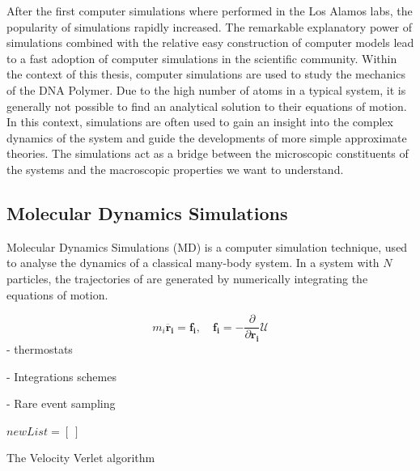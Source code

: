 After the first computer simulations where performed in the Los Alamos labs, the
popularity of simulations rapidly increased. The remarkable explanatory power of
simulations combined with the relative easy construction of computer models lead to a
fast adoption of computer simulations in the scientific community. Within the context of
this thesis, computer simulations are used to study the mechanics of
the DNA Polymer. Due to the high number of atoms in a typical system, it is generally
not possible to find an analytical solution to their equations of motion. In this
context, simulations are often used to gain an insight into the complex dynamics of the
system and guide the developments of more simple approximate theories. The simulations
act as a bridge between the microscopic constituents of the systems and the macroscopic
properties we want to understand.


\subsection{Molecular Dynamics Simulations}
Molecular Dynamics Simulations (MD) is a computer simulation technique, used to analyse
the dynamics of a classical many-body system. In a system with $N$ particles, the
trajectories of are generated by numerically integrating the equations of motion.

\[
    m_i \boldsymbol{\ddot{r_i}} = \boldsymbol{f_i}, \quad \boldsymbol{f_i} = -
    \frac{\partial}{\partial \boldsymbol{r_i}} \mathcal{U}
\]
- thermostats

- Integrations schemes

- Rare event sampling

\begin{algorithm}


    $newList = [\ ]$


    \caption{The Velocity Verlet algorithm}
\end{algorithm}


